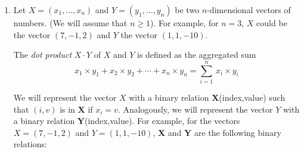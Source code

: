 \documentclass{article}
\begin{document}
\begin{enumerate}
For example, consider $p(x) = 2x^2 -5 x +5$ and $q(x) = 4x^4+ 3x^3 + x^2 - x$.
Then $p(x)*q(x) = (8)x^6 + (6-20) x^5 +(2-15+20)x^4 +(-2-5+15)x^3+(5+5)x^2+(-5)x=8x^6-14x^5+7x^4+8x^3+10x^2-5x$.
So, for these polynomials, your SQL query should return the relation

\begin{center}
\begin{tabular}{c}
 $
\begin{array}{c|c}
\mbox{\rm coefficient} & \mbox{\rm degree} \\ \hline
8 & 6 \\
-14 & 5 \\
7 & 4 \\
8 & 3 \\
10 & 2\\
- 5 & 1\\
0 & 0
\end{array}$
\end{tabular}
\end{center}



Your solution should work for arbitrary polynomials $p(x)$ and $q(x)$.
 

\item Let $X=(x_1,\ldots,x_n)$ and $Y=(y_1,\ldots,y_n)$ be two $n$-dimensional
  vectors of numbers. (We will assume that $n\geq 1$).   For example, for $n=3$, $X$ could be the vector $(7,-1,2)$ and $Y$ the vector $(1,1,-10)$.

  The \emph{dot product} $X\cdot Y$ of $X$ and $Y$ is defined as the aggregated sum
  \[x_1\times y_1+x_2\times y_2+\cdots+x_n\times y_n=\sum_{i=1}^n\, x_i\times y_i\]

We will represent the vector $X$ with a binary relation
{\bf X}(index,value) such that $(i,v)$ is in {\bf X} if $x_i = v$.  
Analogously, we will represent the vector $Y$ with a binary relation {\bf Y}(index,value).
For example, for the vectors $X=(7,-1,2)$ and $Y=(1,1,-10)$,
{\bf X} and {\bf Y} are the following binary relations:


\end{enumerate}
\end{document}
